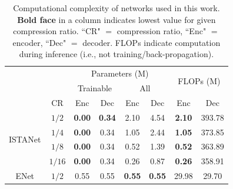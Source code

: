 \begin{table}[htb]
\centering
\caption{Computational complexity of networks used in this work. \textbf{Bold face} in a column indicates lowest value for given compression ratio. ``CR" $=$ compression ratio, ``Enc" $=$ encoder, ``Dec" $=$ decoder. FLOPs indicate computation during inference (i.e., not training/back-propagation).}
\label{tab:net-complexity} 

\begin{tabular}{|cc|cccc|cc|}
\hline
\multicolumn{2}{|c|}{\multirow{2}{*}{}}                    & \multicolumn{4}{c|}{Parameters (M)}                                                                                          & \multicolumn{2}{c|}{\multirow{2}{*}{FLOPs (M)}}     \\ \cline{3-6}
\multicolumn{2}{|c|}{}                                     & \multicolumn{2}{c|}{Trainable}                                          & \multicolumn{2}{c|}{All}                           & \multicolumn{2}{c|}{}                               \\ \hline
\multicolumn{1}{|c|}{}                            & CR     & \multicolumn{1}{c|}{Enc}           & \multicolumn{1}{c|}{Dec}           & \multicolumn{1}{c|}{Enc}           & Dec           & \multicolumn{1}{c|}{Enc}           & Dec            \\ \hline
\multicolumn{1}{|c|}{\multirow{4}{*}{ISTANet}}    & $1/2$  & \multicolumn{1}{c|}{\textbf{0.00}} & \multicolumn{1}{c|}{\textbf{0.34}} & \multicolumn{1}{c|}{2.10}          & 4.54          & \multicolumn{1}{c|}{\textbf{2.10}} & 393.78         \\ \cline{2-8} 
\multicolumn{1}{|c|}{}                            & $1/4$  & \multicolumn{1}{c|}{\textbf{0.00}} & \multicolumn{1}{c|}{0.34}          & \multicolumn{1}{c|}{1.05}          & 2.44          & \multicolumn{1}{c|}{\textbf{1.05}} & 373.85         \\ \cline{2-8} 
\multicolumn{1}{|c|}{}                            & $1/8$  & \multicolumn{1}{c|}{\textbf{0.00}} & \multicolumn{1}{c|}{0.34}          & \multicolumn{1}{c|}{0.52}          & 1.39          & \multicolumn{1}{c|}{\textbf{0.52}} & 363.89         \\ \cline{2-8} 
\multicolumn{1}{|c|}{}                            & $1/16$ & \multicolumn{1}{c|}{\textbf{0.00}} & \multicolumn{1}{c|}{0.34}          & \multicolumn{1}{c|}{0.26}          & 0.87          & \multicolumn{1}{c|}{\textbf{0.26}} & 358.91         \\ \hline
\multicolumn{1}{|c|}{\multirow{4}{*}{ENet}}       & $1/2$  & \multicolumn{1}{c|}{0.55}          & \multicolumn{1}{c|}{0.55}          & \multicolumn{1}{c|}{\textbf{0.55}} & \textbf{0.55} & \multicolumn{1}{c|}{29.98}         & 29.70          \\ \cline{2-8} 

\end{tabular}
\end{table}
